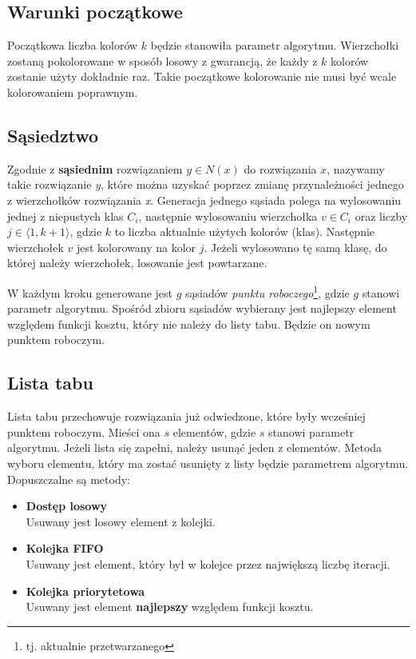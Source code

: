 \documentclass[12pt,a4paper]{article}
\begin{document}
\subsection{Warunki początkowe}
Początkowa liczba kolorów $k$ będzie stanowiła parametr algorytmu. Wierzchołki zostaną pokolorowane w sposób losowy z gwarancją, że każdy z $k$ kolorów zostanie użyty dokładnie raz. Takie początkowe kolorowanie nie musi być wcale kolorowaniem poprawnym.


\subsection{Sąsiedztwo}
Zgodnie z \cite{coloring} \textbf{sąsiednim} rozwiązaniem $y\in N(x)$ do rozwiązania $x$, nazywamy takie rozwiązanie \textit{y}, które można uzyskać poprzez zmianę przynależności jednego z wierzchołków rozwiązania \textit{x}. Generacja jednego sąsiada polega na wylosowaniu jednej z niepustych klas $C_i$, następnie wylosowaniu wierzchołka $v\in C_i$ oraz liczby $j\in\langle1,k+1\rangle$, gdzie $k$ to liczba aktualnie użytych kolorów (klas). Następnie wierzchołek $v$ jest kolorowany na kolor $j$. Jeżeli wylosowano tę samą klasę, do której należy wierzchołek, losowanie jest powtarzane.

W każdym kroku generowane jest $g$ sąsiadów \textit{punktu roboczego}\footnote{tj. aktualnie przetwarzanego}, gdzie $g$ stanowi parametr algorytmu. Spośród zbioru sąsiadów wybierany jest najlepszy element względem funkcji kosztu, który nie należy do listy tabu. Będzie on nowym punktem roboczym.

\subsection{Lista tabu}
Lista tabu przechowuje rozwiązania już odwiedzone, które były wcześniej punktem roboczym. Mieści ona $s$ elementów, gdzie $s$ stanowi parametr algorytmu.
Jeżeli lista się zapełni, należy usunąć jeden z elementów. Metoda wyboru elementu, który ma zostać usunięty z listy będzie parametrem algorytmu. Dopuszczalne są metody:
\begin{itemize}

\item \textbf{Dostęp losowy} \\
Usuwany jest losowy element z kolejki.
\item \textbf{Kolejka FIFO} \\
Usuwany jest element, który był w kolejce przez największą liczbę iteracji.
\item \textbf{Kolejka priorytetowa} \\
Usuwany jest element \textbf{najlepszy} względem funkcji kosztu.

\end{itemize}
\end{document}
